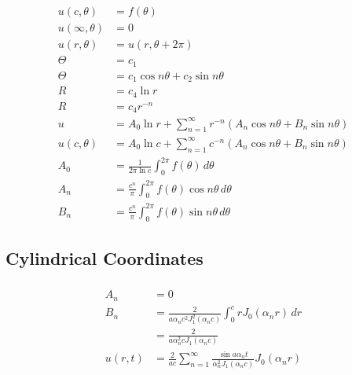 \documentclass{article}
\begin{document}
\begin{align*}
  u(c, \theta)      & = f(\theta)                                                                      \\
  u(\infty, \theta) & = 0                                                                              \\
  u(r, \theta)      & = u(r, \theta + 2 \pi)                                                           \\
  \Theta            & = c_1                                                                            \\
  \Theta            & = c_1 \cos n \theta + c_2 \sin n \theta                                          \\
  R                 & = c_4 \ln r                                                                      \\
  R                 & = c_4 r^{-n}                                                                     \\
  u                 & = A_0 \ln r + \sum_{n = 1}^\infty r^{-n} (A_n \cos n \theta + B_n \sin n \theta) \\
  u(c, \theta)      & = A_0 \ln c + \sum_{n = 1}^\infty c^{-n} (A_n \cos n \theta + B_n \sin n \theta) \\
  A_0               & = \frac{1}{2 \pi \ln c} \int_0^{2 \pi} f(\theta) \,d \theta                      \\
  A_n               & = \frac{c^n}{\pi} \int_0^{2 \pi} f(\theta) \cos n \theta \,d \theta              \\
  B_n               & = \frac{c^n}{\pi} \int_0^{2 \pi} f(\theta) \sin n \theta \,d \theta
\end{align*}

\subsection{Cylindrical Coordinates}

\subsubsection{}

\begin{align*}
  A_n     & = 0                                                                                                      \\
  B_n     & = \frac{2}{a \alpha_n c^2 J_1^2(\alpha_n c)} \int_0^c r J_0(\alpha_n r) \,d r                            \\
          & = \frac{2}{a \alpha_n^2 c J_1(\alpha_n c)}                                                               \\
  u(r, t) & = \frac{2}{a c} \sum_{n = 1}^\infty \frac{\sin a \alpha_n t}{\alpha_n^2 J_1(\alpha_n c)} J_0(\alpha_n r)
\end{align*}
\end{document}

